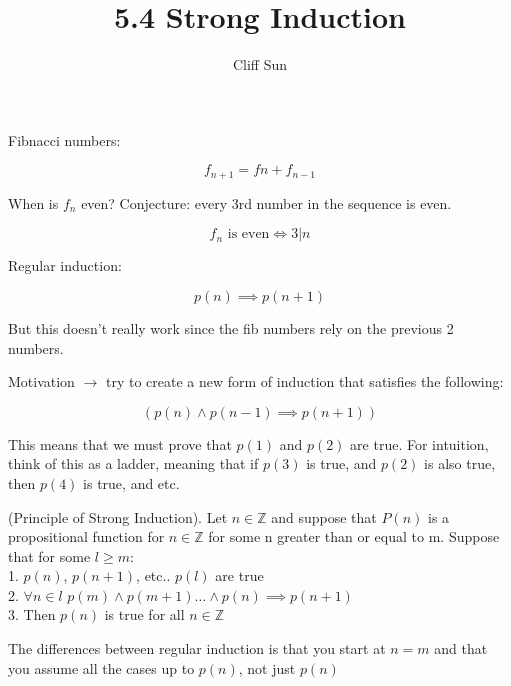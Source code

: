 \documentclass{article}
\title{5.4 Strong Induction}
\author{Cliff Sun}
\begin{document}
\maketitle

\begin{center}
\end{center}

Fibnacci numbers:

\begin{equation}
    f_{n+1} = f{n} + f_{n-1}
\end{equation}

When is $f_n$ even? Conjecture: every 3rd number in the sequence is even.

\begin{equation}
    \textrm{$f_n$ is even} \iff 3|n 
\end{equation}

Regular induction:

\begin{equation}
    p(n) \implies p(n+1)
\end{equation}

But this doesn't really work since the fib numbers rely on the previous 2 numbers.

Motivation $\rightarrow$ try to create a new form of induction that satisfies the following:

\begin{equation}
    (p(n) \land p(n-1) \implies p(n+1))
\end{equation}

This means that we must prove that $p(1)$ and $p(2)$ are true. For intuition, think of this as a ladder, meaning that if $p(3)$ is true, and $p(2)$ is also true, then $p(4)$ is true, and etc.

\begin{center}
    (Principle of Strong Induction). Let $n \in \mathbb{Z}$ and suppose that $P(n)$ is a propositional function for $n \in \mathbb{Z}$ for some n greater than or equal to m. Suppose that for some $l \geq m$: \\
    1. $p(n)$, $p(n+1)$, etc.. $p(l)$ are true \\
    2. $\forall n \in l$ $p(m) \land p(m+1) \dots \land p(n) \implies p(n+1)$ \\
    3. Then $p(n)$ is true for all $n \in \mathbb{Z}$
\end{center}

The differences between regular induction is that you start at $n=m$ and that you assume all the cases up to $p(n)$, \linebreak not just $p(n)$ \\
\end{document}
